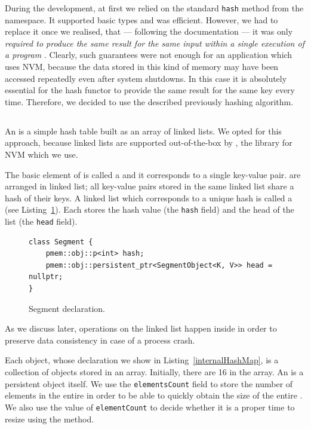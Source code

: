     During the development, at first we relied on the standard \texttt{hash} method from the \std namespace. It supported basic \std types and was efficient.
    However, we had to replace it once we realised, that --- following the documentation --- it was only \textit{required to produce the same result for the same input within a single execution of a program} \cite{StdHash}.
    Clearly, such guarantees were not enough for an application which uses NVM, because the data stored in this kind of memory may have been accessed repeatedly even after system shutdowns. In this case it is absolutely essential for the hash functor to provide the same result for the same key every time.    
    Therefore, we decided to use the described previously hashing algorithm.

\subsection{\internalHashMap}

    An \internalHashMap is a simple hash table built as an array of linked lists.
    We opted for this approach, because linked lists are supported out-of-the-box by \libpmemobj, the library for NVM which we use. 
    
    The basic element of \internalHashMap is called a \SegmentObject and it corresponds to a single key-value pair. \SegmentObject are arranged in linked list; all key-value pairs stored in the same linked list share a hash of their keys. A linked list which corresponds to a unique hash is called a \Segment (see Listing~\ref{Segment}). Each \Segment stores the hash value (the \texttt{hash} field) and the head of the list (the \texttt{head} field).

\begin{figure}[ht]
\renewcommand{\figurename}{Listing}
\begin{lstlisting}
class Segment {
    pmem::obj::p<int> hash;
    pmem::obj::persistent_ptr<SegmentObject<K, V>> head = nullptr;
}
\end{lstlisting}
\caption{Segment declaration.}
\label{Segment}
\end{figure}

    As we discuss later, operations on the linked list happen inside \pmdktransactions in order to preserve data consistency in case of a process crash.
    
    Each \internalHashMap object, whose declaration we show in Listing~\ref{internalHashMap}, is a collection of \Segment objects stored in an array. Initially, there are 16 \Segments in the \segments array. An \internalHashMap is a persistent object itself. We use the \texttt{elementsCount} field to store the number of elements in the entire \internalHashMap in order to be able to quickly obtain the size of the entire \NvmHashMap. We also use the value of \texttt{elementCount} to decide whether it is a proper time to resize \internalHashMap using the \expandMethod method.

